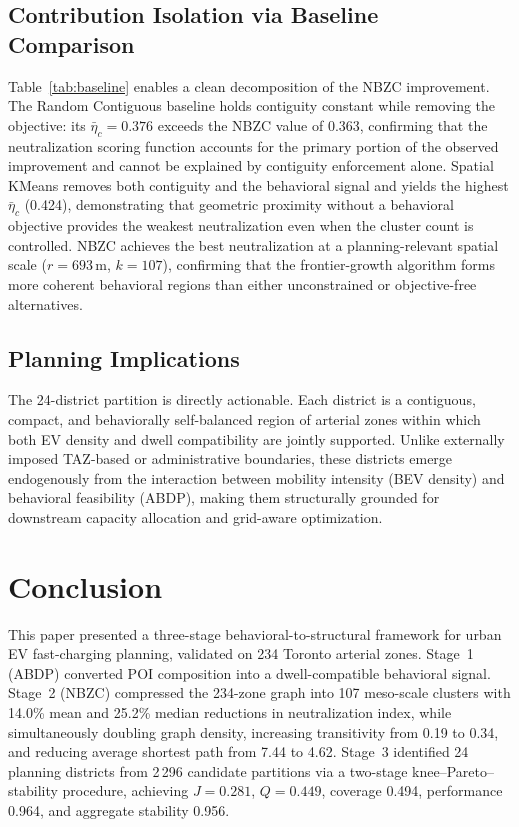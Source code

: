 \documentclass[conference]{IEEEtran}
\begin{document}
\subsection{Contribution Isolation via Baseline Comparison}
Table~\ref{tab:baseline} enables a clean decomposition of the NBZC
improvement.
The Random Contiguous baseline holds contiguity constant while removing
the objective: its $\bar{\eta}_c=0.376$ exceeds the NBZC value of
0.363, confirming that the neutralization scoring function accounts for
the primary portion of the observed improvement and cannot be explained
by contiguity enforcement alone.
Spatial KMeans removes both contiguity and the behavioral signal and
yields the highest $\bar{\eta}_c$ (0.424), demonstrating that geometric
proximity without a behavioral objective provides the weakest
neutralization even when the cluster count is controlled.
NBZC achieves the best neutralization at a planning-relevant spatial
scale ($r=693$\,m, $k=107$), confirming that the frontier-growth
algorithm forms more coherent behavioral regions than either
unconstrained or objective-free alternatives.

\subsection{Planning Implications}
The 24-district partition is directly actionable.
Each district is a contiguous, compact, and behaviorally self-balanced
region of arterial zones within which both EV density and dwell
compatibility are jointly supported.
Unlike externally imposed TAZ-based or administrative boundaries,
these districts emerge endogenously from the interaction between
mobility intensity (BEV density) and behavioral feasibility (ABDP),
making them structurally grounded for downstream capacity allocation
and grid-aware optimization.

\section{Conclusion}

This paper presented a three-stage behavioral-to-structural framework
for urban EV fast-charging planning, validated on 234 Toronto arterial
zones.
Stage~1 (ABDP) converted POI composition into a dwell-compatible
behavioral signal.
Stage~2 (NBZC) compressed the 234-zone graph into 107 meso-scale
clusters with 14.0\% mean and 25.2\% median reductions in neutralization
index, while simultaneously doubling graph density, increasing
transitivity from 0.19 to 0.34, and reducing average shortest path
from 7.44 to 4.62.
Stage~3 identified 24 planning districts from 2\,296 candidate
partitions via a two-stage knee--Pareto--stability procedure, achieving
$J=0.281$, $Q=0.449$, coverage 0.494, performance 0.964, and aggregate
stability 0.956.
\end{document}
